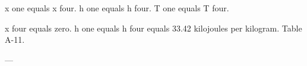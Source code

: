 x one equals x four.  
h one equals h four.  
T one equals T four.  

x four equals zero.  
h one equals h four equals 33.42 kilojoules per kilogram.  
Table A-11.  

---